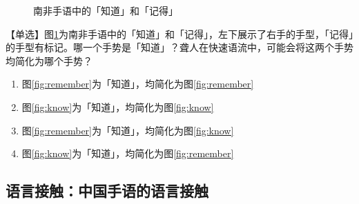 \documentclass[12pt, a4paper, oneside]{ctexart}
\begin{document}
\begin{figure}[H]
{\begin{minipage}[t]{0.5\linewidth}
    \end{minipage}%
    \label{fig:remember}%
    }%
    \centering
    \caption{南非手语中的「知道」和「记得」}
    \label{fig:南非手语}
\end{figure}

【单选】图\ref{fig:南非手语}为南非手语中的「知道」和「记得」，左下展示了右手的手型，「记得」的手型有标记。哪一个手势是「知道」？聋人在快速语流中，可能会将这两个手势均简化为哪个手势？
\begin{enumerate}[label=\Alph*.]
    \item 图\ref{fig:remember}为「知道」，均简化为图\ref{fig:remember}
    \item 图\ref{fig:know}为「知道」，均简化为图\ref{fig:know}
    \item 图\ref{fig:remember}为「知道」，均简化为图\ref{fig:know}
    \item 图\ref{fig:know}为「知道」，均简化为图\ref{fig:remember}
\end{enumerate}

\subsection{语言接触：中国手语的语言接触}
\end{document}
